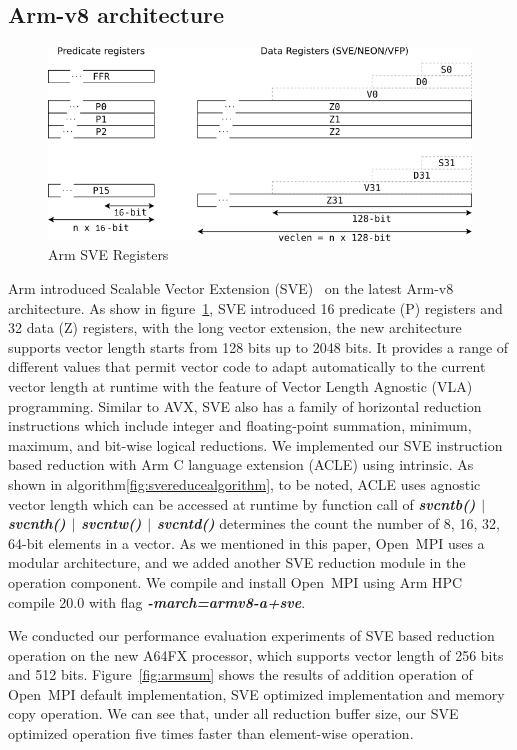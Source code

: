 \documentclass[5p,times,twocolumn]{elsarticle}
\newcommand{\ompi}[0]{Open~MPI\xspace}
\begin{document}
\subsection{Arm-v8 architecture}
\begin{figure}[h]
    \centering
    \includegraphics[width=\linewidth]{armsvereg.png}
    \caption{Arm SVE Registers}
    \label{fig:armsvereg}
\end{figure}
Arm introduced Scalable Vector Extension (SVE)~\cite{armSVE2} on the latest Arm-v8 architecture.
As show in figure~\ref{fig:armsvereg}, SVE introduced 16 predicate (P) registers and 32 data (Z) registers,
with the long vector extension, the new architecture
supports vector length starts
from 128 bits up to 2048 bits. It provides a range of different
values that permit vector code to adapt automatically to the
current vector length at runtime with the feature of Vector
Length Agnostic (VLA) programming. Similar to AVX, SVE also has a family of
horizontal reduction instructions
which include integer and floating-point summation, minimum, maximum,
and bit-wise logical reductions.
We implemented our SVE instruction based reduction with Arm
C language extension (ACLE) using intrinsic. As shown in algorithm\ref{fig:svereducealgorithm},
to be noted, ACLE uses agnostic vector length which can be accessed at runtime by
function call of \emph{\textbf{\textit{svcntb() $\mid$ svcnth() $\mid$ svcntw() $\mid$ svcntd()}}}
determines the count the number of 8, 16, 32, 64-bit elements in a vector.
As we mentioned in this paper, \ompi uses a modular architecture,
and we added another SVE reduction module in the operation component. We compile
and install \ompi using Arm HPC compile 20.0 with
flag \emph{\textbf{\textit{-march=armv8-a+sve}}}.

We conducted our performance evaluation experiments of SVE based reduction operation on
the new A64FX processor, which supports vector length of 256 bits and 512 bits.
Figure~\ref{fig:armsum} shows the results of addition operation of \ompi default implementation,
SVE optimized implementation and memory copy operation. We can see that, under all reduction
buffer size, our SVE optimized operation five times faster than element-wise operation.
\end{document}
